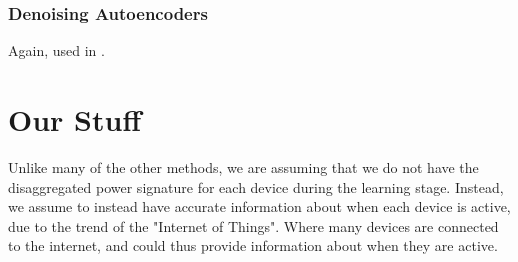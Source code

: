 \documentclass{article}
\begin{document}
\subsubsection{Denoising Autoencoders}

Again, used in \cite{Kelly}.



\section{Our Stuff}


Unlike many of the other methods, we are assuming that we do not have the disaggregated power signature for each device during the learning stage.
Instead, we assume to instead have accurate information about when each device is active, due to the trend of the "Internet of Things".
Where many devices are connected to the internet, and could thus provide information about when they are active.
\end{document}
